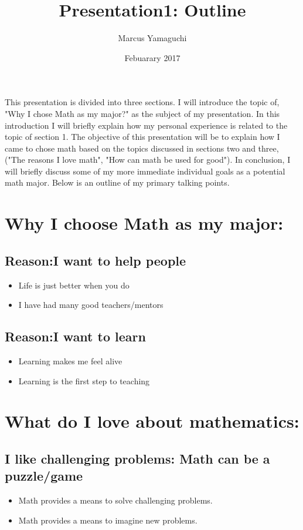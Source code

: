 \documentclass[12pt]{article}
\begin{document}
	\title{Presentation1: Outline}
	\author{Marcus Yamaguchi}
	\date{Febuarary 2017}
	This presentation is divided into three sections. I will introduce the topic of, "Why I chose Math as my major?" as the subject of my presentation. In this introduction I will briefly explain how my personal experience is related to the topic of section 1. The objective of this presentation will be to explain how I came to chose math based on the topics discussed in sections two and three, ("The reasons I love math", "How can math be used for good"). In conclusion, I will briefly discuss some of my more immediate individual goals as a potential math major. Below is an outline of my primary talking points.\par 
		
	\section{Why I choose Math as my major:}
		\subsection{Reason:I want to help people}
			\begin{itemize}
				\item Life is just better when you do
				\item I have had many good teachers/mentors
			\end{itemize}
		\subsection{Reason:I want to learn}
			\begin{itemize}
				\item Learning makes me feel alive
				\item Learning is the first step to teaching
			\end{itemize}
	\section{What do I love about mathematics:}

		\subsection{I like challenging problems: Math can be a puzzle/game}
			\begin{itemize}
				\item Math provides a means to solve challenging problems.
				\item Math provides a means to imagine new problems. 
			\end{itemize}
\end{document}
